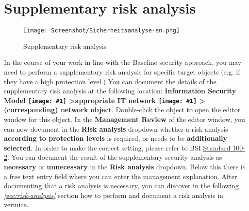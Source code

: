 \documentclass[a4paper,10pt]{book}
\newcommand{\icon}[1]{\texttt{[image: \#1]}}
\begin{document}
\section{Supplementary risk analysis}\label{sec_risk_analysis}
\begin{figure}[htb!]
  \centering
  \texttt{[image: Screenshot/Sicherheitsanalyse-en.png]}
  \caption{\label{Supplementary risk analysis} Supplementary risk analysis}
\end{figure}
In the course of your work in line with the Baseline security approach, you may need to perform a
supplementary risk analysis for specific target objects (e.g. if they have a high protection level.)
You can document the details of the supplementary risk analysis at the following location:
\textbf{Information Security Model \icon{Icon/GS_Modell.png} \textgreater appropriate IT network
\icon{Icon/GS_Modell.png} \textgreater (corresponding) network object}.
Double-click the object to open the editor window for this object. In the \textbf{Management Review}
of the editor window, you can now document in the \textbf{Risk analysis} dropdown whether a risk analysis
\textbf{according to protection levels} is required, or needs to be \textbf{additionally selected}.
In order to make the correct setting, please refer to BSI
\href{https://www.bsi.bund.de/DE/Themen/ITGrundschutz/ITGrundschutzStandards/ITGrundschutzStandards_node.html#doc471418bodyText2}{Standard 100-2}.
You can document the result of the supplementary security analysis as \textbf{necessary} or \textbf{unnecessary}
in the \textbf{Risk analysis} dropdown. Below this there is a free text entry field where you can enter the
management explanation. After documenting that a risk analysis is necessary, you can discover in the
following {\em \ref{sec:risk-analysis} } section how to perform and document a risk analysis in verinice.
\end{document}
